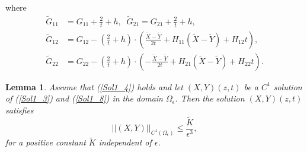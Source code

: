 \documentclass[3p,11pt]{elsarticle}
\numberwithin{equation}{section}
\newtheorem{lemma}{Lemma}[section]
\begin{document}
where
\begin{equation*}\label{Sol3_11}
    \begin{split}
        \widetilde G_{11}&=G_{11}+\frac{2}{t}+h,\;\; \widetilde G_{21}=G_{21}+\frac{2}{t}+h,\\
        \widetilde G_{12}&=G_{12}-\left(\frac{2}{t}+h\right)\cdot\left(\frac{\widetilde X-\widetilde Y}{2t}+H_{11}(\widetilde X-\widetilde Y)+H_{12}t\right),\\
        \widetilde G_{22}&=G_{22}-\left(\frac{2}{t}+h\right)\cdot \left(-\frac{\widetilde X-\widetilde Y}{2t}+H_{21}(\widetilde X-\widetilde Y)+H_{22}t\right).
    \end{split}
\end{equation*}
\begin{lemma}\label{Sol_3_l2}
    Assume that (\ref{Sol1_4}) holds and let $(X, Y)(z, t)$ be a $C^{1}$ solution of (\ref{Sol1_3}) and (\ref{Sol1_8}) in the domain $\Omega_{\epsilon}$. Then the solution $(X, Y)(z, t)$ satisfies
    \begin{equation}
        ||(X, Y)||_{C^1(\Omega_\epsilon)} \leq \frac{\widetilde K}{\epsilon^3},
    \end{equation}
    for a positive constant $\widetilde K$ independent of $\epsilon$.
\end{lemma}
\end{document}
